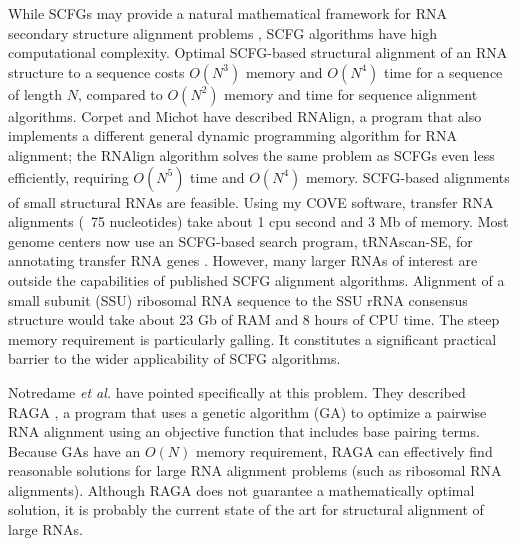 \documentclass[11pt]{article}
\begin{document}
While SCFGs may provide a natural mathematical framework for RNA
secondary structure alignment problems \cite{Durbin98}, SCFG
algorithms have high computational complexity. Optimal SCFG-based
structural alignment of an RNA structure to a sequence costs $O(N^3)$
memory and $O(N^4)$ time for a sequence of length $N$, compared to
$O(N^2)$ memory and time for sequence alignment algorithms. Corpet and
Michot have described RNAlign, a program that also implements a
different general dynamic programming algorithm for RNA alignment; the
RNAlign algorithm solves the same problem as SCFGs even less
efficiently, requiring $O(N^5)$ time and $O(N^4)$ memory.  SCFG-based
alignments of small structural RNAs are feasible. Using my COVE
software, transfer RNA alignments (~75 nucleotides) take about 1 cpu
second and 3 Mb of memory. Most genome centers now use an SCFG-based
search program, tRNAscan-SE, for annotating transfer RNA genes
\cite{LoweEddy97}. However, many larger RNAs of interest are outside
the capabilities of published SCFG alignment algorithms. Alignment of
a small subunit (SSU) ribosomal RNA sequence to the SSU rRNA consensus
structure would take about 23 Gb of RAM and 8 hours of CPU time. The
steep memory requirement is particularly galling. It constitutes a
significant practical barrier to the wider applicability of SCFG
algorithms.


Notredame \emph{et al.} have pointed specifically at this problem.
They described RAGA \cite{Notredame97}, a program that uses a genetic
algorithm (GA) to optimize a pairwise RNA alignment using an objective
function that includes base pairing terms. Because GAs have an $O(N)$
memory requirement, RAGA can effectively find reasonable solutions for
large RNA alignment problems (such as ribosomal RNA
alignments). Although RAGA does not guarantee a mathematically optimal
solution, it is probably the current state of the art for structural
alignment of large RNAs.
\end{document}
